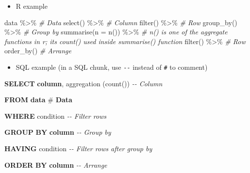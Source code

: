 \documentclass[
]{book}
\newenvironment{Shaded}{\begin{snugshade}}{\end{snugshade}}
\newcommand{\AttributeTok}[1]{\textcolor[rgb]{0.77,0.63,0.00}{#1}}
\newcommand{\CommentTok}[1]{\textcolor[rgb]{0.56,0.35,0.01}{\textit{#1}}}
\newcommand{\FunctionTok}[1]{\textcolor[rgb]{0.00,0.00,0.00}{#1}}
\newcommand{\KeywordTok}[1]{\textcolor[rgb]{0.13,0.29,0.53}{\textbf{#1}}}
\newcommand{\NormalTok}[1]{#1}
\newcommand{\SpecialCharTok}[1]{\textcolor[rgb]{0.00,0.00,0.00}{#1}}
\providecommand{\tightlist}{%
  \setlength{\itemsep}{0pt}\setlength{\parskip}{0pt}}
\begin{document}
\begin{itemize}
\tightlist
\item
  R example
\end{itemize}

\begin{Shaded}
\begin{Highlighting}[]

\NormalTok{data }\SpecialCharTok{\%\textgreater{}\%} \CommentTok{\# Data }
  \FunctionTok{select}\NormalTok{() }\SpecialCharTok{\%\textgreater{}\%} \CommentTok{\# Column}
  \FunctionTok{filter}\NormalTok{() }\SpecialCharTok{\%\textgreater{}\%} \CommentTok{\# Row }
  \FunctionTok{group\_by}\NormalTok{() }\SpecialCharTok{\%\textgreater{}\%} \CommentTok{\# Group by }
  \FunctionTok{summarise}\NormalTok{(}\AttributeTok{n =} \FunctionTok{n}\NormalTok{()) }\SpecialCharTok{\%\textgreater{}\%} \CommentTok{\# n() is one of the aggregate functions in r; it\textquotesingle{}s count() used inside summarise() function }
  \FunctionTok{filter}\NormalTok{() }\SpecialCharTok{\%\textgreater{}\%} \CommentTok{\# Row }
  \FunctionTok{order\_by}\NormalTok{() }\CommentTok{\# Arrange }
\end{Highlighting}
\end{Shaded}

\begin{itemize}
\tightlist
\item
  SQL example (in a SQL chunk, use \texttt{-\/-} instead of \texttt{\#} to comment)
\end{itemize}

\begin{Shaded}
\begin{Highlighting}[]

\KeywordTok{SELECT} \KeywordTok{column}\NormalTok{, aggregation (}\FunctionTok{count}\NormalTok{())\textasciigrave{} }\CommentTok{{-}{-} Column}

\KeywordTok{FROM} \KeywordTok{data}\NormalTok{ \# }\KeywordTok{Data} 

\KeywordTok{WHERE}\NormalTok{ condition }\CommentTok{{-}{-} Filter rows }

\KeywordTok{GROUP} \KeywordTok{BY} \KeywordTok{column} \CommentTok{{-}{-} Group by}

\KeywordTok{HAVING}\NormalTok{ condition }\CommentTok{{-}{-} Filter rows after group by  }

\KeywordTok{ORDER} \KeywordTok{BY} \KeywordTok{column} \CommentTok{{-}{-} Arrange }
\end{Highlighting}
\end{Shaded}
\end{document}
